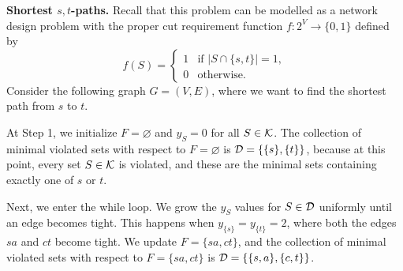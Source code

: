 {\bf Shortest $s,t$-paths.} Recall that this problem can be modelled 
as a network design problem with the proper cut requirement function 
$f : 2^V \to \{0, 1\}$ defined by 
\[ f(S) = \begin{cases}
    1 & \text{if } |S \cap \{s, t\}| = 1, \\ 
    0 & \text{otherwise.}
\end{cases} \] 
Consider the following graph $G = (V, E)$, where we want to find the shortest 
path from $s$ to $t$.
\begin{center}
\end{center}\vspace{-0.25cm}
At Step 1, we initialize $F = \varnothing$ and $y_S = 0$ for all $S \in {\cal K}$. 
The collection of minimal violated sets with respect to $F = \varnothing$ is 
${\cal D} = \{\{s\}, \{t\}\}$, because at this point, every set $S \in {\cal K}$ 
is violated, and these are the minimal sets containing exactly one of $s$ or $t$.

Next, we enter the while loop. We grow the $y_S$ values for $S \in {\cal D}$ 
uniformly until an edge becomes tight. This happens when $y_{\{s\}} = y_{\{t\}} = 2$, 
where both the edges $sa$ and $ct$ become tight. We update 
$F = \{sa, ct\}$, and the collection of minimal violated sets with respect to 
$F = \{sa, ct\}$ is ${\cal D} = \{\{s, a\}, \{c, t\}\}$.

